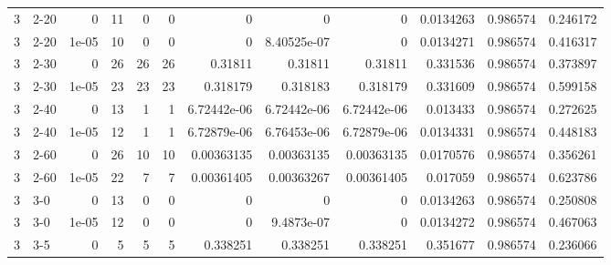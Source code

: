 \begin{tabular}{rlrrrrrrrrrr}
     3 & 2-20   &      0     &          11 &                 0 &                 0 &     0           &     0           &      0           &        0.0134263 &               0.986574 &           0.246172 \\
     3 & 2-20   &      1e-05 &          10 &                 0 &                 0 &     0           &     8.40525e-07 &      0           &        0.0134271 &               0.986574 &           0.416317 \\
     3 & 2-30   &      0     &          26 &                26 &                26 &     0.31811     &     0.31811     &      0.31811     &        0.331536  &               0.986574 &           0.373897 \\
     3 & 2-30   &      1e-05 &          23 &                23 &                23 &     0.318179    &     0.318183    &      0.318179    &        0.331609  &               0.986574 &           0.599158 \\
     3 & 2-40   &      0     &          13 &                 1 &                 1 &     6.72442e-06 &     6.72442e-06 &      6.72442e-06 &        0.013433  &               0.986574 &           0.272625 \\
     3 & 2-40   &      1e-05 &          12 &                 1 &                 1 &     6.72879e-06 &     6.76453e-06 &      6.72879e-06 &        0.0134331 &               0.986574 &           0.448183 \\
     3 & 2-60   &      0     &          26 &                10 &                10 &     0.00363135  &     0.00363135  &      0.00363135  &        0.0170576 &               0.986574 &           0.356261 \\
     3 & 2-60   &      1e-05 &          22 &                 7 &                 7 &     0.00361405  &     0.00363267  &      0.00361405  &        0.017059  &               0.986574 &           0.623786 \\
     3 & 3-0    &      0     &          13 &                 0 &                 0 &     0           &     0           &      0           &        0.0134263 &               0.986574 &           0.250808 \\
     3 & 3-0    &      1e-05 &          12 &                 0 &                 0 &     0           &     9.4873e-07  &      0           &        0.0134272 &               0.986574 &           0.467063 \\
     3 & 3-5    &      0     &           5 &                 5 &                 5 &     0.338251    &     0.338251    &      0.338251    &        0.351677  &               0.986574 &           0.236066 \\

\end{tabular}
